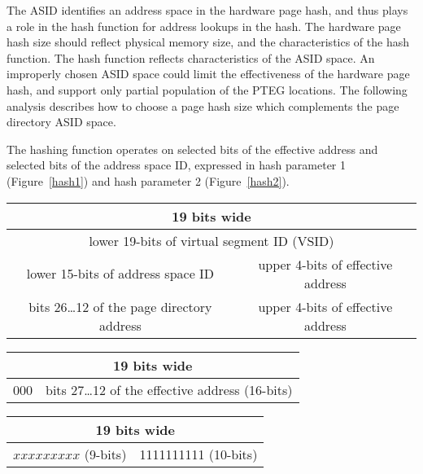 \documentclass[a4paper]{article}
\begin{document}
The ASID identifies an address space in the hardware page hash, and thus plays
a role in the hash function for address lookups in the hash.
The hardware page hash size should reflect physical memory size, and the 
characteristics of the hash function.  
The hash function reflects 
characteristics of the ASID space.  An improperly chosen ASID space
could limit the effectiveness of the hardware page hash, and support only
partial population of the PTEG locations.  The following analysis describes
how to choose a page hash size which complements the page directory ASID
space.

The hashing function operates on selected bits of
the effective address and selected bits of the address space ID, expressed in
hash parameter 1 (Figure~\ref{hash1}) and hash parameter 2 (Figure~\ref{hash2}).

\begin{figure*}[htb]
\begin{center}
\begin{tabular}{|c|c|} \hline
\multicolumn{2}{|c|}{19 bits wide} \\ \hline
\multicolumn{2}{|c|}{lower 19-bits of virtual segment ID (VSID)} \\ \hline
lower 15-bits of address space ID 
  & upper 4-bits of effective address \\ \hline
bits 26\dots 12 of the page directory address 
  & upper 4-bits of effective address \\ \hline
\end{tabular}
\end{center}
\caption{Hash parameter 1.}
\label{hash1}
\end{figure*}

\begin{figure*}[htb]
\begin{center}
\begin{tabular}{|c|c|} \hline
\multicolumn{2}{|c|}{19 bits wide} \\ \hline
000
  & bits 27\dots 12 of the effective address (16-bits) \\ \hline
\end{tabular}
\end{center}
\caption{Hash parameter 2.}
\label{hash2}
\end{figure*}

\begin{figure*}[htb]
\begin{center}
\begin{tabular}{|c|c|} \hline
\multicolumn{2}{|c|}{19 bits wide} \\ \hline
$xxxxxxxxx$ (9-bits) & 1111111111 (10-bits) \\ \hline
\end{tabular}
\end{center}
\caption{HTABMASK}
\label{htabmask}
\end{figure*}
\end{document}

